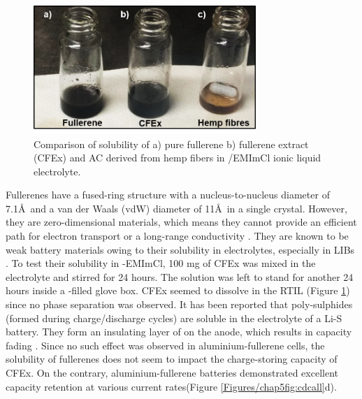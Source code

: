 \begin{figure}[h!]
\centering
\includegraphics[width=0.75\textwidth]{Figures/chap5fig/cfexsol}
\caption{Comparison of solubility of a) pure  fullerene b) fullerene extract (CFEx) and AC derived from hemp fibers in /EMImCl ionic liquid electrolyte.}
\label{Figures/chap5fig:cfexsol}
\end{figure}

Fullerenes have a fused-ring structure with a nucleus-to-nucleus diameter of 7.1\AA\ and a van der Waals (vdW) diameter of 11\AA\ in a single crystal. However, they are zero-dimensional materials, which means they cannot provide an efficient path for electron transport or a long-range conductivity \cite{loutfy_fullerene_2002, winkler_two-component_2007}. They are known to be weak battery materials owing to their solubility in electrolytes, especially in LIBs \cite{seger_prospects_1991}. To test their solubility in -EMImCl, 100 mg of CFEx was mixed in the electrolyte and stirred for 24 hours. The solution was left to stand for another 24 hours inside a -filled glove box. CFEx seemed to dissolve in the RTIL (Figure \ref{Figures/chap5fig:cfexsol}) since no phase separation was observed. It has been reported that poly-sulphides (formed during charge/discharge cycles) are soluble in the electrolyte of a Li-S battery. They form an insulating layer of  on the anode, which results in capacity fading \cite{sun_effect_2017}. Since no such effect was observed in aluminium-fullerene cells, the solubility of fullerenes does not seem to impact the charge-storing capacity of CFEx. On the contrary, aluminium-fullerene batteries demonstrated excellent capacity retention at various current rates(Figure \ref{Figures/chap5fig:cdcall}d).   

